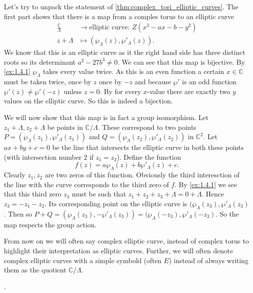 \documentclass[a4paper]{article}
\theoremstyle{theoremdd}
\theoremstyle{definitiondd}
\theoremstyle{remarkdd}
\newcommand{\C}{\mathbb{C}}
\begin{document}
Let's try to unpack the statement of \cref{thm:complex_tori_elliptic_curves}.
The first part shows that there is a map from a comples torus to an elliptic curve 
\begin{align*}
	\frac{\C}{\Lambda} &\longrightarrow \text{elliptic curve: } Z(x^3 - a x - b -y ^2) \\
	z+\Lambda &\longmapsto \left(\wp_\Lambda(z), \wp'_\Lambda(z)\right)
.\end{align*}
We know that this is an elliptic curve as it the right hand side has three distinct roots so its determinant $a^2 - 27 b^3 \ne 0  $.
We can see that this map is bijective. By \cref{ex:1.4.1}  $\wp_\Lambda$  takes every value twice. As this is an even function a certain $x \in \C$ must be taken twice, once by $z$ once by $-z$ and because $\wp'$ is an odd function $\wp'(z) \ne \wp'(-z)$ unless $z = 0$.  By for every $x$-value there are exactly two $y$ values on the elliptic curve. So this is indeed a bijection. 

We will now show that this map is in fact a group isomorphism.
Let $z_1 + \Lambda, z_2 + \Lambda$ be points in $\C / \Lambda$.
These correspond to two points $P = (\wp_{\Lambda}(z_1), \wp'_\Lambda(z_1))$ and $ Q = (\wp_{\Lambda}(z_2), \wp'_\Lambda(z_2))$ in $\C^2$. 
Let $ax + by + c = 0$ be the line that intersects the elliptic curve in both these points (with intersection number 2 if  $z_1 = z_2$).
Define the function \[
	f(z) = a \wp_{\Lambda}(z) + b \wp'_\Lambda(z) + c
.\] 
Clearly $z_1, z_2$ are two zeros of this function. Obviously the third interesction of the line with the curve corresponds to the third zero of $f$. 
By \cref{ex:1.4.1} we see that this third zero $z_3$ must be such that $z_1 + z_2 + z_3 + \Lambda = 0 + \Lambda$. 
Hence $z_3 = - z_1 - z_2$. Its corresponding point on the elliptic curve is 
$(\wp_\Lambda(z_3), \wp'_\Lambda(z_3)$. Then so $P + Q = (\wp_\Lambda(z_3), - \wp'_\Lambda(z_3)) = (\wp_\Lambda(-z_3), \wp'_\Lambda(-z_3)$. 
So the map respects the group action. 


From now on we will often say complex elliptic curve, instead of complex torus to highlight their interpretation as elliptic curves. Further, we will often denote complex elliptic curves with a simple symbold (often $E$) instead of always writing them as the quotient  $\C / \Lambda$.

.
\end{document}
